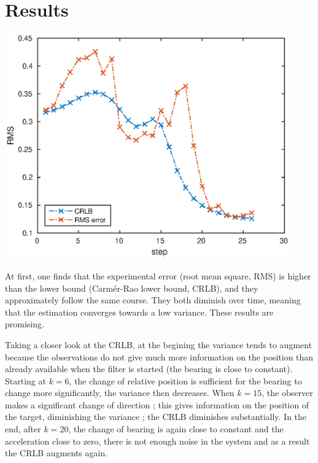 \documentclass[english,DIV=13]{scrreprt}
\begin{document}
\section*{Results}
\begin{center}
   \includegraphics[width=0.92\textwidth]{img/q6.eps}
\end{center}

At first, one finds that the experimental error (root mean square, RMS) is higher than the lower bound (Carmér-Rao lower bound,
CRLB), and they approximately follow the same course. They both diminish over time, meaning that the estimation converges towards a low variance. These results
 are promising.

Taking a closer look at the CRLB, at the begining the variance tends to augment because the observations do not give much
more information on the position than already available when the filter is started
(the bearing is close to constant). Starting at $k=6$, the change
of relative position is sufficient for the bearing to change more significantly, the variance then decreases.
When $k=15$, the observer makes a significant change of direction ; this gives information on the position of the
target, diminishing the variance ;  the CRLB diminishes substantially. In the end, after $k=20$, the change of bearing is again
close to constant and the acceleration close to zero, there is not enough noise in the system and as a result the CRLB augments
again.
\end{document}
